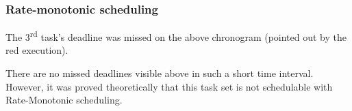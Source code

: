 \subsubsection{Rate-monotonic scheduling}

\begin{RTGrid}[width=10cm]{3}{20}







\end{RTGrid}

The 3\textsuperscript{rd} task's deadline was missed on the above chronogram (pointed out by the red execution). \\

\begin{RTGrid}[width=10cm]{3}{22}







\end{RTGrid}

There are no missed deadlines visible above in such a short time interval. However, it was proved theoretically that this task set is not schedulable with Rate-Monotonic scheduling.\\

